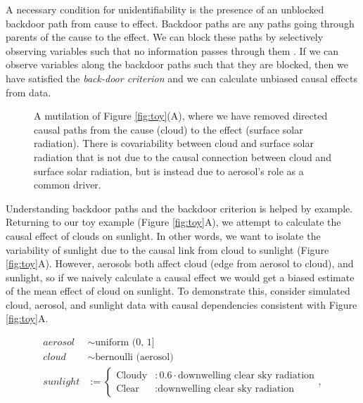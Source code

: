 \documentclass[12pt]{article}
\begin{document}

A necessary condition for unidentifiability is the presence of an
unblocked backdoor path from cause to effect. Backdoor paths are any
paths going through parents of the cause to the effect. We can block
these paths by selectively observing variables such that no
information passes through them \citep{geiger-d-sep}. If we can
observe variables along the backdoor paths such that they are blocked,
then we have satisfied the \emph{back-door criterion}
\citep{pearl2009} and we can calculate unbiased causal effects from
data.

\begin{figure}
  
  \caption{A mutilation of Figure \ref{fig:toy}(A), where we have
    removed directed causal paths from the cause (cloud) to the effect
    (surface solar radiation). There is covariability between cloud
    and surface solar radiation that is not due to the causal
    connection between cloud and surface solar radiation, but is
    instead due to aerosol's role as a common driver.}
  \label{fig:mutilated-toy}
\end{figure}

Understanding backdoor paths and the backdoor criterion is helped by
example. Returning to our toy example (Figure \ref{fig:toy}A), we
attempt to calculate the causal effect of clouds on sunlight. In other
words, we want to isolate the variability of sunlight due to the
causal link from cloud to sunlight (Figure \ref{fig:toy}A). However,
aerosols both affect cloud (edge from aerosol to cloud), and sunlight,
so if we naively calculate a causal effect we would get a biased
estimate of the mean effect of cloud on sunlight. To demonstrate this,
consider simulated cloud, aerosol, and sunlight data with causal
dependencies consistent with Figure \ref{fig:toy}A.

\begin{align}
  aerosol &\sim \text{uniform (0, 1]}\\
  cloud &\sim \text{bernoulli (aerosol)}\\
  sunlight &:= \begin{cases}
    \text{Cloudy} &: 0.6 \cdot \text{downwelling clear sky radiation}  \\
    \text{Clear} &: \text{downwelling clear sky radiation}
  \end{cases},
                   \label{eq:1}
\end{align}
\end{document}
